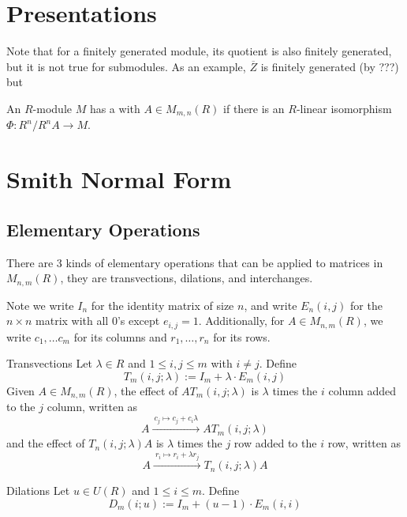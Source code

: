 \documentclass{styles/tufte}
\begin{document}
\section{Presentations}

Note that for a finitely generated module, its quotient is also finitely generated, but it is not true for submodules. As an example, $\overline{Z}$ is finitely generated (by ???) but

\begin{definition}{}{}
  An $R$-module $M$ has a  with  $A \in M_{m,n}(R)$ if there is an $R$-linear isomorphism $\Phi: R^n/R^nA \to M$.
\end{definition}



\section{Smith Normal Form}

\subsection{Elementary Operations}
  
  There are 3 kinds of elementary operations that can be applied to matrices in $M_{n,m}(R)$, they are transvections, dilations, and interchanges.
  
  Note we write $I_n$ for the identity matrix of size $n$, and write $E_n(i, j)$ for the $n \times n$ matrix with all $0$'s except $e_{i,j} = 1$. Additionally, for $A \in M_{n,m}(R)$, we write $c_1, \dots c_m$ for its columns and $r_1, \dots, r_n$ for its rows.
  
  \begin{definition}{Transvections}{}
    Let $\lambda \in R$ and $1 \leqslant i,j \leqslant m$ with $i \neq j$. Define
    \[ T_m(i, j; \lambda) := I_m + \lambda \cdot E_m(i, j) \]
    Given $A \in M_{n,m}(R)$, the effect of $A T_m(i, j; \lambda)$ is $\lambda$ times the $i$ column added to the $j$ column, written as
    \[ A \xrightarrow{\ c_j \mapsto c_j + c_i \lambda\ } A T_m(i, j; \lambda) \]
    and the effect of $T_n(i, j; \lambda) A$ is $\lambda$ times the $j$ row added to the $i$ row, written as
    \[ A \xrightarrow{\ r_i \mapsto r_i + \lambda r_j\ } T_n(i, j; \lambda) A \]
  \end{definition}
  
  \begin{definition}{Dilations}{}
     Let $u \in U(R)$ and $1 \leqslant i \leqslant m$. Define
    \[ D_m(i; u) := I_m + (u - 1) \cdot E_m(i, i) \]
  \end{definition}
  
\end{document}
